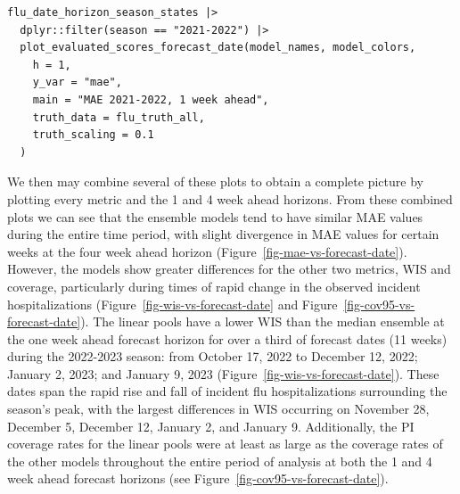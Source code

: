 \documentclass[
  article,
  shortnames,
  notitle]{jss}
\begin{document}
\begin{verbatim}
flu_date_horizon_season_states |>
  dplyr::filter(season == "2021-2022") |>
  plot_evaluated_scores_forecast_date(model_names, model_colors,
    h = 1,
    y_var = "mae",
    main = "MAE 2021-2022, 1 week ahead",
    truth_data = flu_truth_all,
    truth_scaling = 0.1
  )
\end{verbatim}

We then may combine several of these plots to obtain a complete picture
by plotting every metric and the 1 and 4 week ahead horizons. From these
combined plots we can see that the ensemble models tend to have similar
MAE values during the entire time period, with slight divergence in MAE
values for certain weeks at the four week ahead horizon
(Figure~\ref{fig-mae-vs-forecast-date}). However, the models show
greater differences for the other two metrics, WIS and coverage,
particularly during times of rapid change in the observed incident
hospitalizations (Figure~\ref{fig-wis-vs-forecast-date} and
Figure~\ref{fig-cov95-vs-forecast-date}). The linear pools have a lower
WIS than the median ensemble at the one week ahead forecast horizon for
over a third of forecast dates (11 weeks) during the 2022-2023 season:
from October 17, 2022 to December 12, 2022; January 2, 2023; and January
9, 2023 (Figure~\ref{fig-wis-vs-forecast-date}). These dates span the
rapid rise and fall of incident flu hospitalizations surrounding the
season's peak, with the largest differences in WIS occurring on November
28, December 5, December 12, January 2, and January 9. Additionally, the
PI coverage rates for the linear pools were at least as large as the
coverage rates of the other models throughout the entire period of
analysis at both the 1 and 4 week ahead forecast horizons (see
Figure~\ref{fig-cov95-vs-forecast-date}).
\end{document}
